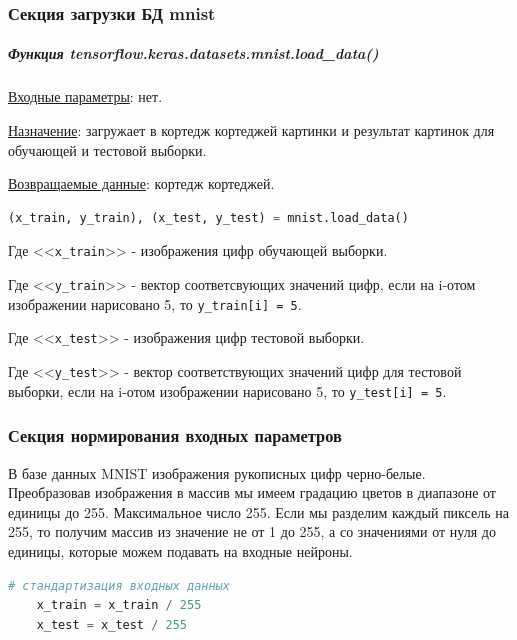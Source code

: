 \subsubsection*{Секция загрузки БД mnist}

\subparagraph{Функция tensorflow.keras.datasets.mnist.load\_data()} \hspace{0pt}

\underline{Входные параметры}: нет.

\underline{Назначение}: загружает в кортедж кортеджей картинки и результат картинок для обучающей и тестовой выборки.

\underline{Возвращаемые данные}: кортедж кортеджей.

\begin{lstlisting}[language=Python,]
    (x_train, y_train), (x_test, y_test) = mnist.load_data()
\end{lstlisting}

Где <<\verb|x_train|>> - изображения цифр обучающей выборки.

Где <<\verb|у_train|>> - вектор соответсвующих значений цифр,
если на i-отом изображении нарисовано 5, то \verb|y_train[i] = 5|.

Где <<\verb|x_test|>> - изображения цифр тестовой выборки.

Где <<\verb|у_test|>> - вектор соответствующих значений цифр для тестовой выборки,
если на i-отом изображении нарисовано 5, то \verb|y_test[i] = 5|.



\subsubsection*{Секция нормирования входных параметров}

В базе данных MNIST изображения рукописных цифр черно-белые. Преобразовав изображения в массив мы имеем градацию цветов в диапазоне от единицы до 255. Максимальное число 255. Если мы разделим каждый пиксель на 255, то получим массив из значение не от 1 до 255, а со значениями от нуля до единицы, которые можем подавать на входные нейроны.

\begin{lstlisting}[language=Python,]
    # стандартизация входных данных
    x_train = x_train / 255
    x_test = x_test / 255
\end{lstlisting}



\newpage



